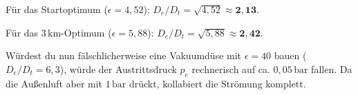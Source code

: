 \documentclass{scrartcl}
\begin{document}
Für das Startoptimum ($\epsilon = 4{,}52$): $D_e / D_t = \sqrt{4{,}52} \approx \mathbf{2{,}13}$.

Für das $3\,\text{km}$-Optimum ($\epsilon = 5{,}88$): $D_e / D_t = \sqrt{5{,}88} \approx \mathbf{2{,}42}$.

Würdest du nun fälschlicherweise eine Vakuumdüse mit $\epsilon = 40$ bauen ($D_e / D_t = 6{,}3$), würde der Austrittsdruck $p_{e}$ rechnerisch auf ca. $0{,}05\,\text{bar}$ fallen. Da die Außenluft aber mit $1\,\text{bar}$ drückt, kollabiert die Strömung komplett.
\end{document}
